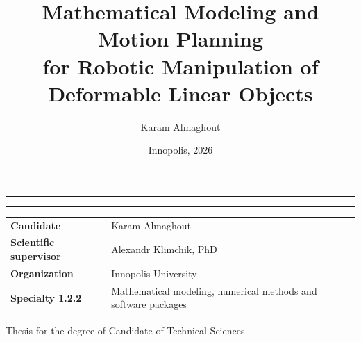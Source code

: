 \documentclass[aspectratio=169,10pt]{beamer}
\title[Mathematical modeling and motion planning]{%
  Mathematical Modeling and Motion Planning\\
  for Robotic Manipulation of Deformable Linear Objects}
\author[Karam Almaghout]{Karam Almaghout}
\institute{Innopolis University}
\date{Innopolis, 2026}
\begin{document}
\begin{frame}[plain]
  \vspace*{0.52cm}
  {\color{IUBlue}\rule{\textwidth}{1.0pt}}\par
  \vspace{0.45cm}
  {\color{Ink}\inserttitle\par}
  \vspace{0.25cm}
  {\color{IUBlue}\rule{0.28\textwidth}{2.2pt}}\par

  \vspace{0.70cm}
  \begin{tabular}{@{}p{4.1cm}p{8.5cm}@{}}
    \textbf{Candidate} & Karam Almaghout\\[0.28cm]
    \textbf{Scientific supervisor} & Alexandr Klimchik, PhD\\[0.28cm]
    \textbf{Organization} & Innopolis University\\[0.28cm]
    \textbf{Specialty 1.2.2} &
      Mathematical modeling, numerical methods and software packages
  \end{tabular}

  \vfill
  \begin{flushright}
    \color{MidGray}Thesis for the degree of Candidate of Technical Sciences
  \end{flushright}
\end{frame}
\end{document}
